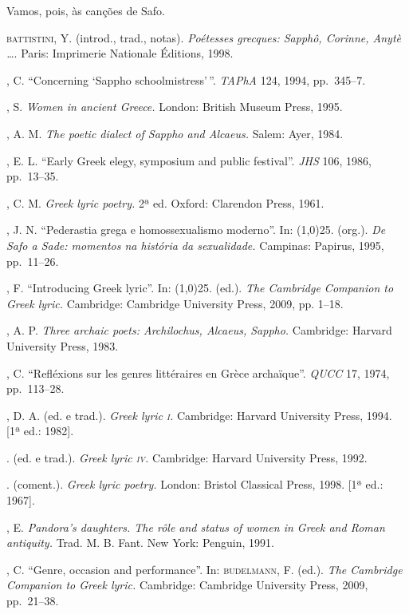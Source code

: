 Vamos, pois, às canções de Safo.


\begin{bibliohedra}
\textsc{battistini}, Y. (introd., trad., notas). \textit{Poétesses grecques:
Sapphô, Corinne, Anytè \ldots{}}. Paris: Imprimerie Nationale Éditions, 1998.

, C. “Concerning ‘Sappho schoolmistress’\,”. \textit{TAPhA} 124,
1994, pp.~345--7.

, S. \textit{Women in ancient Greece.} London: British Museum
Press, 1995.

, A. M. \textit{The poetic dialect of Sappho and Alcaeus.} Salem:
Ayer, 1984. 

, E. L. “Early Greek elegy, symposium and public festival”.
\textit{JHS} 106, 1986, pp.~13--35.

, C. M. \textit{Greek lyric poetry.} 2ª
ed. Oxford: Clarendon Press, 1961.

, J. N. “Pederastia grega e homossexualismo moderno”. In:
\line(1,0){25}. (org.). \textit{De Safo a Sade: momentos na história da
sexualidade.} Campinas: Papirus, 1995, pp.~11--26.

, F. “Introducing Greek lyric”. In:
\line(1,0){25}. (ed.). \textit{The Cambridge
Companion to Greek lyric.} Cambridge: Cambridge University Press, 2009, pp.
1--18.

, A. P. \textit{Three archaic poets: Archilochus, Alcaeus,
Sappho.} Cambridge: Harvard University Press, 1983. 

, C. “Refléxions sur les genres littéraires en Grèce archaïque”.
\textit{QUCC} 17, 1974, pp.~113--28.

, D. A. (ed. e trad.). \textit{Greek lyric \textsc{i}.} Cambridge:
Harvard University Press, 1994. [1ª ed.: 1982].

\titidem. (ed. e trad.). \textit{Greek lyric \textsc{iv}.} Cambridge: Harvard
University Press, 1992.

\titidem. (coment.). \textit{Greek lyric poetry.} London: Bristol
Classical Press, 1998. [1ª ed.: 1967]. 

, E. \textit{Pandora’s daughters. The rôle and status of
women in Greek and Roman antiquity.} Trad. M. B. Fant. New York: Penguin, 1991.

, C. “Genre, occasion and performance”. In:
\textsc{budelmann}, F. (ed.). \textit{The Cambridge Companion to Greek
lyric.} Cambridge: Cambridge University Press, 2009, pp.~21--38.


\end{bibliohedra}
